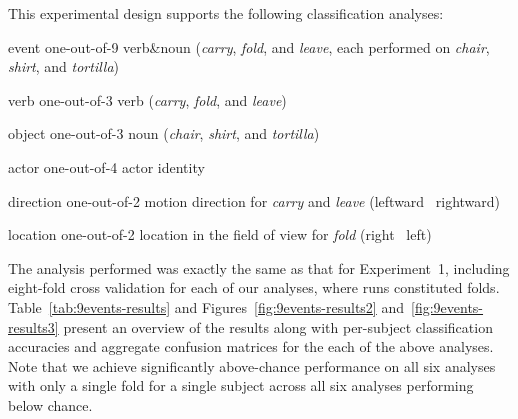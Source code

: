 This experimental design supports the following classification analyses:
%
\begin{compactdesc}
\item[event] one-out-of-9 verb\&noun (\emph{carry}, \emph{fold}, and
  \emph{leave}, each performed on \emph{chair}, \emph{shirt}, and
  \emph{tortilla})
\item[verb] one-out-of-3 verb (\emph{carry}, \emph{fold}, and \emph{leave})
\item[object] one-out-of-3 noun (\emph{chair}, \emph{shirt}, and
  \emph{tortilla})
\item[actor] one-out-of-4 actor identity
\item[direction] one-out-of-2 motion direction for \emph{carry} and \emph{leave}
  (leftward \vs\ rightward)
\item[location] one-out-of-2 location in the field of view for \emph{fold}
  (right \vs\ left)
\end{compactdesc}
%
The analysis performed was exactly the same as that for Experiment~1,
including eight-fold cross validation for each of our analyses, where runs
constituted folds.
%
Table~\ref{tab:9events-results} and Figures~\ref{fig:9events-results2}
and~\ref{fig:9events-results3} present an overview of the results along with
per-subject classification accuracies and aggregate confusion matrices for the
each of the above analyses.
%
Note that we achieve significantly above-chance performance on all six analyses
with only a single fold for a single subject across all six analyses
performing below chance.

